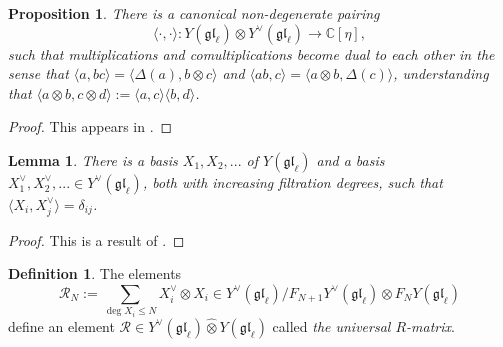 \documentclass[11pt]{report}
\newtheorem{lemma}[theorem]{Lemma}
\newtheorem{prop}[theorem]{Proposition}
\theoremstyle{definition}
\newtheorem{definition}[theorem]{Definition}
\theoremstyle{remark}
\theoremstyle{remark}
\newcommand{\End}{\operatorname{End}}
\newcommand{\Z}{\mathbb{Z}}
\newcommand{\C}{\mathbb{C}}
\begin{document}
\begin{prop}
There is a canonical non-degenerate pairing
\begin{equation*}
\langle \cdot,\cdot \rangle: Y(\mathfrak{gl}_\ell) \otimes Y^\vee(\mathfrak{gl}_\ell) \to \C[\eta],
\end{equation*}
such that multiplications and comultiplications become dual to each other in the sense that $\langle a,bc \rangle = \langle \Delta(a),b \otimes c \rangle$ and $\langle ab,c \rangle = \langle a \otimes b,\Delta(c) \rangle$, understanding that $\langle a \otimes b, c \otimes d \rangle := \langle a,c \rangle \langle b,d \rangle$.
\end{prop}

\begin{proof}
This appears in \cite{article:nazarov:2019}.
\end{proof}

\begin{lemma}
There is a basis $X_1,X_2,...$ of $Y(\mathfrak{gl}_\ell)$ and a basis $X_1^\vee,X_2^\vee,... \in Y^\vee(\mathfrak{gl}_\ell)$, both with increasing filtration degrees, such that $\langle X_i,X_j^\vee \rangle = \delta_{ij}$.
\end{lemma}

\begin{proof}
This is a result of \cite{article:nazarov:2019}.
\end{proof}

\begin{definition}
The elements
\begin{equation}\label{equation:universalRMatrixN}
\mathcal{R}_N := \sum_{\deg X_i \leq N} X_i^\vee \otimes X_i \in Y^\vee(\mathfrak{gl}_\ell)/F_{N+1} Y^\vee(\mathfrak{gl}_\ell) \otimes F_N Y(\mathfrak{gl}_\ell)
\end{equation}
define an element $\mathcal{R} \in Y^\vee(\mathfrak{gl}_\ell) \operatorname{\hat \otimes} Y(\mathfrak{gl}_\ell)$ called \emph{the universal $R$-matrix}.
\end{definition}

%
 
\end{document}

